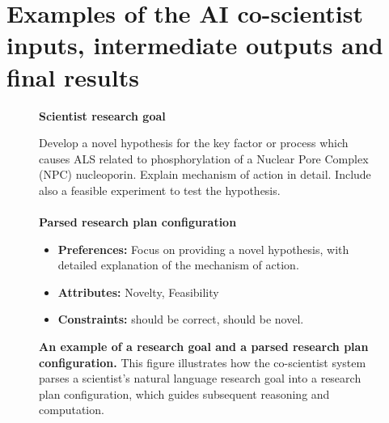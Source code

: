 \section{Examples of the AI co-scientist inputs, intermediate outputs and final results}
\label{sec:supp_ex}

\begin{figure}[htbp!]
\begin{tcolorbox}[
    colback=black!5!white,
    colframe=black!60!white,
    title=\textbf{From research goal to research plan configuration},
    fonttitle=\bfseries,
    arc=3mm,
    boxrule=1pt,
    bottomrule=2pt,
]
\footnotesize
\textbf{Scientist research goal}

Develop a novel hypothesis for the key factor or process which causes ALS related to phosphorylation of a Nuclear Pore Complex (NPC) nucleoporin. Explain mechanism of action in detail. Include also a feasible experiment to test the hypothesis.
\\
\\
\textbf{Parsed research plan configuration}
\begin{itemize}
    \item \textbf{Preferences:} Focus on providing a novel hypothesis, with detailed explanation of the mechanism of action.
    \item \textbf{Attributes:} Novelty, Feasibility
    \item \textbf{Constraints:} should be correct, should be novel.
\end{itemize}
\end{tcolorbox}
\vspace{0.1cm}
\caption{\textbf{An example of a research goal and a parsed research plan configuration.} This figure illustrates how the co-scientist system parses a scientist's natural language research goal into a research plan configuration, which guides subsequent reasoning and computation.}
\label{fig:ex_research_goal}
\end{figure}


